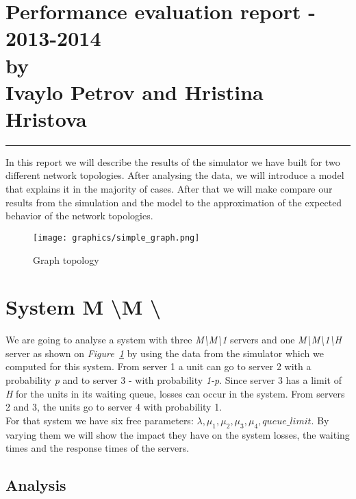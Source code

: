 \documentclass[12pt]{article}
\newcommand{\hr}{\rule{\linewidth}{0.1mm}}
\theoremstyle{plain}
\begin{document}
\section*{\centering
  Performance evaluation report - 2013-2014 \\
  by\\
  Ivaylo Petrov and Hristina Hristova 
}

\hr

In this report we will describe the results of the simulator we have built for
two different network topologies. After analysing the data, we will introduce a
model that explains it in the majority of cases. After that we will make compare
our results from the simulation and the model to the approximation of the expected
behavior of the network topologies.

\begin{figure}
  \caption{Graph topology}
  \texttt{[image: graphics/simple\_graph.png]}\\
  \label{fig:simple_graph}
\end{figure}

\section*{\textbf{System M \textbackslash M \textbackslash *}}

We are going to analyse a system with three \emph{M\textbackslash M\textbackslash 1}
servers and one \emph{M\textbackslash M\textbackslash 1\textbackslash H} server
as shown on \emph{Figure~\ref{fig:simple_graph}} by using the data from the simulator which we computed
for this system. From server 1 a unit can go to server 2 with a probability
\emph{p} and to server 3 - with probability \emph{1-p}. Since server 3 has a
limit of \emph{H} for the units in its waiting queue, losses can occur in the
system. From servers 2 and 3, the units go to server 4 with probability 1.\\
For that system we have six free parameters: $\lambda, \mu_1, \mu_2, \mu_3, \mu_4,
queue\_limit$. By varying them we will show the impact they have on the system
losses, the waiting times and the response times of the servers.

\subsection*{Analysis}
\end{document}
